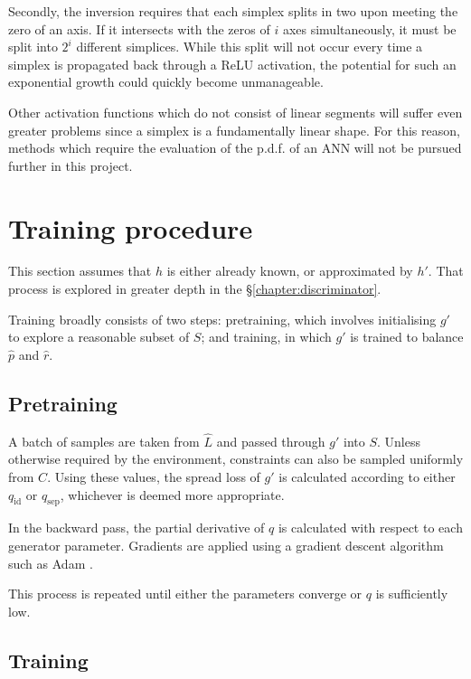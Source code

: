 \documentclass[../../main.tex]{subfiles}
\begin{document}
Secondly, the inversion requires that each simplex splits in two upon meeting the zero of an axis.
If it intersects with the zeros of $i$ axes simultaneously, it must be split into $2^i$ different simplices.
While this split will not occur every time a simplex is propagated back through a ReLU activation, the potential for such an exponential growth could quickly become unmanageable.

Other activation functions which do not consist of linear segments will suffer even greater problems since a simplex is a fundamentally linear shape.
For this reason, methods which require the evaluation of the p.d.f. of an ANN will not be pursued further in this project.

\section{Training procedure} \label{section:generatorTrainingProcedure}

This section assumes that $h$ is either already known, or approximated by $h'$.
That process is explored in greater depth in the \S\ref{chapter:discriminator}.

Training broadly consists of two steps: pretraining, which involves initialising $g'$ to explore a reasonable subset of $S$; and training, in which $g'$ is trained to balance $\hat{p}$ and $\hat{r}$.

\subsection{Pretraining} \label{subsection:pretraining}

A batch of samples are taken from $\hat{L}$ and passed through $g'$ into $S$.
Unless otherwise required by the environment, constraints can also be sampled uniformly from $C$.
Using these values, the spread loss of $g'$ is calculated according to either $q_\text{id}$ or $q_\text{sep}$, whichever is deemed more appropriate.

In the backward pass, the partial derivative of $q$ is calculated with respect to each generator parameter.
Gradients are applied using a gradient descent algorithm such as Adam \cite{kingma17}.

This process is repeated until either the parameters converge or $q$ is sufficiently low.

\subsection{Training} \label{subsection:training}
\end{document}

